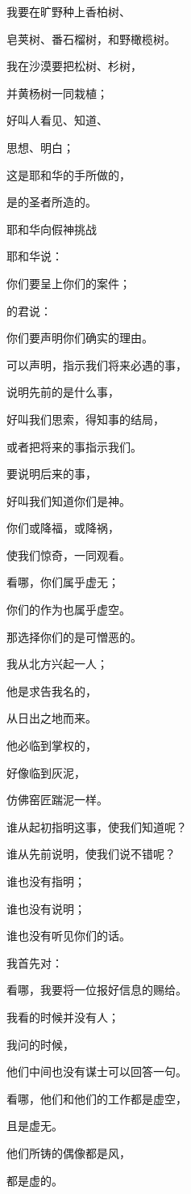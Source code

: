{\par }{\Q {}我要在旷野种上香柏树、
\par }{\Q 皂荚树、番石榴树，和野橄榄树。
\par }{\Q 我在沙漠要把松树、杉树，
\par }{\Q 并黄杨树一同栽植；
\par }{\Q {}好叫人看见、知道、
\par }{\Q 思想、明白；
\par }{\Q 这是耶和华的手所做的，
\par }{\Q 是{}的圣者所造的。
\par }{\SH 耶和华向假神挑战
\par }{\Q {}耶和华{}说：
\par }{\Q 你们要呈上你们的案件；
\par }{的君说：
\par }{\Q 你们要声明你们确实的理由。
\par }{\Q {}可以声明，指示我们将来必遇的事，
\par }{\Q 说明先前的是什么事，
\par }{\Q 好叫我们思索，得知事的结局，
\par }{\Q 或者把将来的事指示我们。
\par }{\Q {}要说明后来的事，
\par }{\Q 好叫我们知道你们是神。
\par }{\Q 你们或降福，或降祸，
\par }{\Q 使我们惊奇，一同观看。
\par }{\Q {}看哪，你们属乎虚无；
\par }{\Q 你们的作为也属乎虚空。
\par }{\Q 那选择你们的是可憎恶的。
\par }{\BB \par }{\Q {}我从北方兴起一人；
\par }{\Q 他是求告我名的，
\par }{\Q 从日出之地而来。
\par }{\Q 他必临到掌权的，
\par }{\Q 好像临到灰泥，
\par }{\Q 仿佛窑匠踹泥一样。
\par }{\Q {}谁从起初指明这事，使我们知道呢？
\par }{\Q 谁从先前说明，使我们说{}不错呢？
\par }{\Q 谁也没有指明；
\par }{\Q 谁也没有说明；
\par }{\Q 谁也没有听见你们的话。
\par }{\Q {}我首先对{}{}：
\par }{\Q 看哪，我要将一位报好信息的赐给{}。
\par }{\Q {}我看的时候并没有人；
\par }{\Q 我问的时候，
\par }{\Q 他们中间也没有谋士可以回答一句。
\par }{\Q {}看哪，他们和他们的工作都是虚空，
\par }{\Q 且是虚无。
\par }{\Q 他们所铸的偶像都是风，
\par }{\Q 都是虚的。

}
